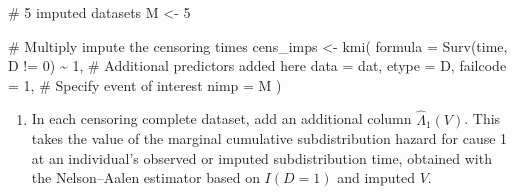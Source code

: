 \documentclass[
  12pt,
  a4paper,
]{article}
\newenvironment{Shaded}{\begin{snugshade}}{\end{snugshade}}
\newcommand{\AttributeTok}[1]{\textcolor[rgb]{0.40,0.45,0.13}{#1}}
\newcommand{\CommentTok}[1]{\textcolor[rgb]{0.37,0.37,0.37}{#1}}
\newcommand{\ControlFlowTok}[1]{\textcolor[rgb]{0.00,0.23,0.31}{#1}}
\newcommand{\DecValTok}[1]{\textcolor[rgb]{0.68,0.00,0.00}{#1}}
\newcommand{\FunctionTok}[1]{\textcolor[rgb]{0.28,0.35,0.67}{#1}}
\newcommand{\NormalTok}[1]{\textcolor[rgb]{0.00,0.23,0.31}{#1}}
\newcommand{\OtherTok}[1]{\textcolor[rgb]{0.00,0.23,0.31}{#1}}
\newcommand{\SpecialCharTok}[1]{\textcolor[rgb]{0.37,0.37,0.37}{#1}}
\newcommand{\StringTok}[1]{\textcolor[rgb]{0.13,0.47,0.30}{#1}}
\providecommand{\tightlist}{%
  \setlength{\itemsep}{0pt}\setlength{\parskip}{0pt}}\usepackage{longtable,booktabs,array}
\begin{document}
\begin{Shaded}
\begin{Highlighting}[]
\CommentTok{\# 5 imputed datasets}
\NormalTok{M }\OtherTok{\textless{}{-}} \DecValTok{5}

\CommentTok{\# Multiply impute the censoring times}
\NormalTok{cens\_imps }\OtherTok{\textless{}{-}} \FunctionTok{kmi}\NormalTok{(}
  \AttributeTok{formula =} \FunctionTok{Surv}\NormalTok{(time, D }\SpecialCharTok{!=} \DecValTok{0}\NormalTok{) }\SpecialCharTok{\textasciitilde{}} \DecValTok{1}\NormalTok{, }\CommentTok{\# Additional predictors added here}
  \AttributeTok{data =}\NormalTok{ dat,}
  \AttributeTok{etype =}\NormalTok{ D,}
  \AttributeTok{failcode =} \DecValTok{1}\NormalTok{, }\CommentTok{\# Specify event of interest}
  \AttributeTok{nimp =}\NormalTok{ M}
\NormalTok{)}
\end{Highlighting}
\end{Shaded}

\begin{enumerate}
\def\labelenumi{\arabic{enumi}.}
\setcounter{enumi}{2}
\tightlist
\item
  In each censoring complete dataset, add an additional column
  \(\hat{\Lambda}_1(V)\). This takes the value of the marginal
  cumulative subdistribution hazard for cause 1 at an individual's
  observed or imputed subdistribution time, obtained with the
  Nelson--Aalen estimator based on \(I(D = 1)\) and imputed \(V\).
\end{enumerate}

\begin{Shaded}
\end{Shaded}
\end{document}
